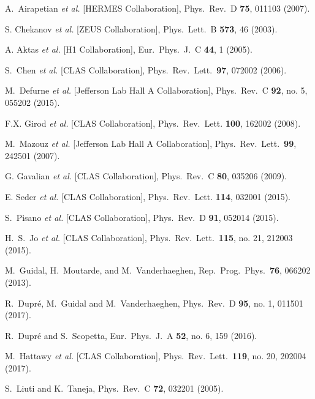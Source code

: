 \documentclass[twocolumn,nofootinbib,prl,superscriptaddress,secnumarabic,amssymb,nobibnotes,aps,floatfix]{revtex4}
\begin{document}
\begin{thebibliography}{99}
 A.~Airapetian {\it et al.} [HERMES Collaboration],
Phys.\ Rev.\ D {\bf 75}, 011103 (2007).

S. Chekanov {\it et al.} [ZEUS Collaboration],
Phys.\ Lett.\  B {\bf 573}, 46 (2003).

A. Aktas {\it et al.} [H1 Collaboration],
Eur.\ Phys.\ J.\ C {\bf 44}, 1 (2005).

S.~Chen {\it et al.} [CLAS Collaboration],
Phys.\ Rev.\ Lett.\ {\bf 97}, 072002 (2006).

M.~Defurne {\it et al.} [Jefferson Lab Hall A Collaboration],
  Phys.\ Rev.\ C {\bf 92}, no. 5, 055202 (2015).

F.X. Girod {\it et al.} [CLAS Collaboration],
Phys.\ Rev.\ Lett. {\bf 100}, 162002 (2008).

   M.~Mazouz {\it et al.} [Jefferson Lab Hall A Collaboration],
   Phys.\ Rev.\ Lett.\  {\bf 99}, 242501 (2007).

G. Gavalian {\it et al.} [CLAS Collaboration],
Phys.\ Rev.\ C {\bf 80}, 035206 (2009).

E. Seder {\it et al.} [CLAS Collaboration],
Phys.\ Rev.\ Lett. {\bf 114}, 032001 (2015).

S.~Pisano {\it et al.} [CLAS Collaboration],
Phys.\ Rev.\ D {\bf 91}, 052014 (2015).

 H.~S.~Jo {\it et al.} [CLAS Collaboration],
  Phys.\ Rev.\ Lett.\  {\bf 115}, no. 21, 212003 (2015).

 M.~Guidal, H.~Moutarde, and M.~Vanderhaeghen,
Rep.\ Prog.\ Phys.\  {\bf 76}, 066202 (2013).

 R.~Dupr\'{e}, M.~Guidal and M.~Vanderhaeghen,
 Phys.\ Rev.\ D {\bf 95}, no. 1, 011501 (2017).

  R.~Dupr\'e and S.~Scopetta,
  Eur.\ Phys.\ J.\ A {\bf 52}, no. 6, 159 (2016).

 M.~Hattawy {\it et al.} [CLAS Collaboration],
   Phys.\ Rev.\ Lett.\  {\bf 119}, no. 20, 202004 (2017).


S.~Liuti and K.~Taneja, Phys.\ Rev.\ C {\bf 72}, 032201 (2005).


\end{thebibliography}
\end{document}
